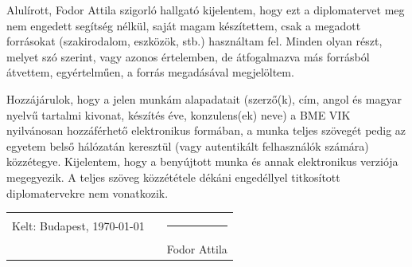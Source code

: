 \thispagestyle{empty}

Alulírott, Fodor Attila szigorló hallgató kijelentem, hogy ezt a diplomatervet meg nem engedett segítség nélkül, saját magam készítettem, csak a megadott forrásokat (szakirodalom, eszközök, stb.) használtam fel. Minden olyan részt, melyet szó szerint, vagy azonos értelemben, de átfogalmazva más forrásból átvettem, egyértelműen, a forrás megadásával megjelöltem.

Hozzájárulok, hogy a jelen munkám alapadatait (szerző(k), cím, angol és magyar nyelvű tartalmi kivonat, készítés éve, konzulens(ek) neve) a BME VIK nyilvánosan hozzáférhető elektronikus formában, a munka teljes szövegét pedig az egyetem belső hálózatán keresztül (vagy autentikált felhasználók számára) közzétegye. Kijelentem, hogy a benyújtott munka és annak elektronikus verziója megegyezik. A teljes szöveg közzététele dékáni engedéllyel titkosított diplomatervekre nem vonatkozik.


\vspace{5 cm}

\begin{tabular}[h]{c c c}

Kelt: Budapest, \today & \hspace{2cm} & \rule{5cm}{.4pt} \\

 & & Fodor Attila

\end{tabular}

\clearpage

\setlength{\parindent}{0.2cm}
\fi